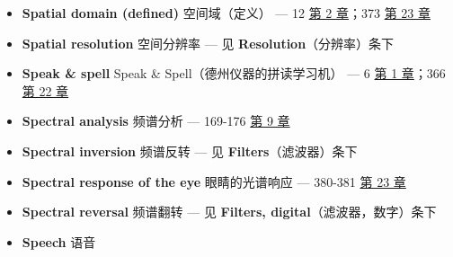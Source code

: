 \begin{itemize}
  \begin{itemize}
  \tightlist
  \item
    convolution vs.~FFT convolution：卷积与 FFT 卷积对比 --- 318
     \hyperref[ch-18]{第 18 章}
  \item
    FIR vs.~IIR filters：FIR 与 IIR 滤波器对比 --- 346-350 
    \hyperref[ch-21]{第 21 章}
  \item
    hardware：硬件 --- 80-84  \hyperref[ch-04]{第 4 章}
  \item
    image convolution：图像卷积 --- 421-422 
    \hyperref[ch-24]{第 24 章}
  \item
    program language：编程语言 --- 76-80  \hyperref[ch-04]{第
    4 章}
  \item
    programming style：编程风格 --- 84-86  \hyperref[ch-04]{第
    4 章}
  \end{itemize}
\item
  \textbf{Spatial domain (defined)} 空间域（定义） --- 12 
  \hyperref[ch-02]{第 2 章}；373  \hyperref[ch-23]{第 23 章}
\item
  \textbf{Spatial resolution} 空间分辨率 --- 见
  \textbf{Resolution}（分辨率）条下
\item
  \textbf{Speak \& spell} Speak \& Spell（德州仪器的拼读学习机） --- 6
   \hyperref[ch-01]{第 1 章}；366 
  \hyperref[ch-22]{第 22 章}
\item
  \textbf{Spectral analysis} 频谱分析 --- 169-176 
  \hyperref[ch-09]{第 9 章}
\item
  \textbf{Spectral inversion} 频谱反转 --- 见
  \textbf{Filters}（滤波器）条下
\item
  \textbf{Spectral response of the eye} 眼睛的光谱响应 --- 380-381
   \hyperref[ch-23]{第 23 章}
\item
  \textbf{Spectral reversal} 频谱翻转 --- 见 \textbf{Filters,
  digital}（滤波器，数字）条下
\item
  \textbf{Speech} 语音


\end{itemize}
